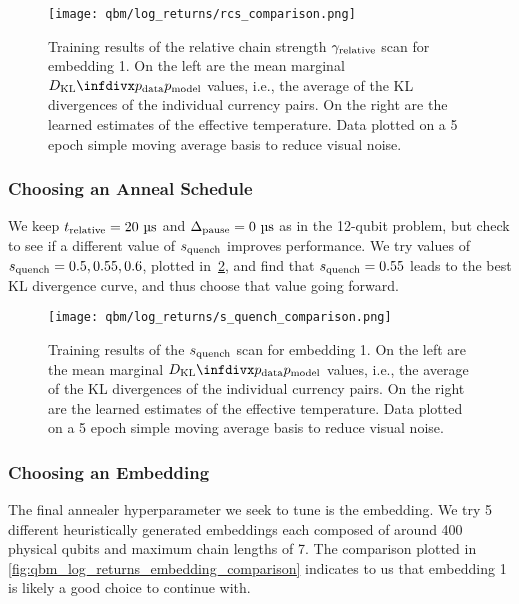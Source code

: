 \begin{figure}[!htb]
    \begin{center}
        \texttt{[image: qbm/log\_returns/rcs\_comparison.png]}
    \end{center}
    \caption{
        Training results of the relative chain strength \( \gamma_{\text{relative}} \) scan for embedding 1.
        On the left are the mean marginal \( \DKL{\pdata}{\pmodel} \) values, i.e., the average of the KL divergences of the individual currency pairs.
        On the right are the learned estimates of the effective temperature.
        Data plotted on a 5 epoch simple moving average basis to reduce visual noise.
    }
    \label{fig:qbm_log_returns_rcs_comparison}
\end{figure}

\subsubsection{Choosing an Anneal Schedule}
We keep \( \trelative = 20 \ \si{\micro\second} \) and \( \Delta_{\text{pause}} = 0 \ \si{\micro\second} \) as in the 12-qubit problem, but check to see if a different value of \( s_{\text{quench}} \) improves performance.
We try values of \( s_{\text{quench}} = 0.5, 0.55, 0.6 \), plotted in~\cref{fig:qbm_log_returns_s_quench_comparison}, and find that \( s_{\text{quench}} = 0.55 \) leads to the best KL divergence curve, and thus choose that value going forward.

\begin{figure}[!htb]
    \begin{center}
        \texttt{[image: qbm/log\_returns/s\_quench\_comparison.png]}
    \end{center}
    \caption{
        Training results of the \( s_{\text{quench}} \) scan for embedding 1.
        On the left are the mean marginal \( \DKL{\pdata}{\pmodel} \) values, i.e., the average of the KL divergences of the individual currency pairs.
        On the right are the learned estimates of the effective temperature.
        Data plotted on a 5 epoch simple moving average basis to reduce visual noise.
    }
    \label{fig:qbm_log_returns_s_quench_comparison}
\end{figure}

\subsubsection{Choosing an Embedding}
The final annealer hyperparameter we seek to tune is the embedding.
We try 5 different heuristically generated embeddings each composed of around 400 physical qubits and maximum chain lengths of 7.
The comparison plotted in \cref{fig:qbm_log_returns_embedding_comparison} indicates to us that embedding 1 is likely a good choice to continue with.

